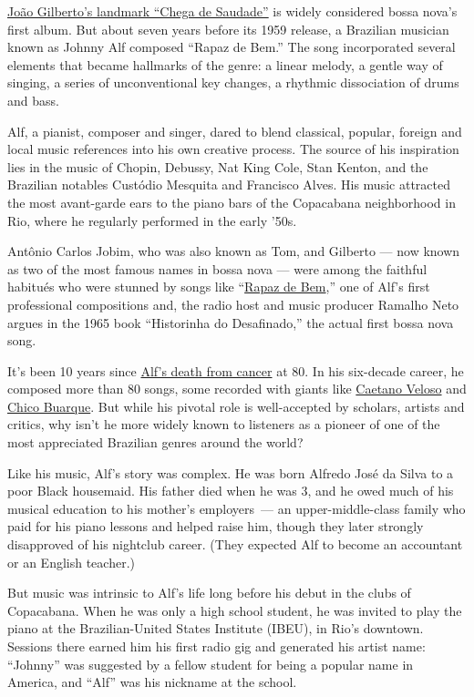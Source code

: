 \href{https://www.youtube.com/watch?v=Zt6JuURjuzg}{João Gilberto's
landmark ``Chega de Saudade''} is widely considered bossa nova's first
album. But about seven years before its 1959 release, a Brazilian
musician known as Johnny Alf composed ``Rapaz de Bem.'' The song
incorporated several elements that became hallmarks of the genre: a
linear melody, a gentle way of singing, a series of unconventional key
changes, a rhythmic dissociation of drums and bass.

Alf, a pianist, composer and singer, dared to blend classical, popular,
foreign and local music references into his own creative process. The
source of his inspiration lies in the music of Chopin, Debussy, Nat King
Cole, Stan Kenton, and the Brazilian notables Custódio Mesquita and
Francisco Alves. His music attracted the most avant-garde ears to the
piano bars of the Copacabana neighborhood in Rio, where he regularly
performed in the early '50s.

Antônio Carlos Jobim, who was also known as Tom, and Gilberto --- now
known as two of the most famous names in bossa nova --- were among the
faithful habitués who were stunned by songs like
``\href{https://www.youtube.com/watch?v=c0rJQ02Fjyo}{Rapaz de Bem},''
one of Alf's first professional compositions and, the radio host and
music producer Ramalho Neto argues in the 1965 book ``Historinha do
Desafinado,'' the actual first bossa nova song.

It's been 10 years since
\href{https://www.nytimes3xbfgragh.onion/2010/03/12/arts/music/12alf.html}{Alf's
death from cancer} at 80. In his six-decade career, he composed more
than 80 songs, some recorded with giants like
\href{https://www.youtube.com/watch?v=Sr20erfxSrk}{Caetano Veloso} and
\href{https://www.youtube.com/watch?v=Z9CfAkqVKvs}{Chico Buarque}. But
while his pivotal role is well-accepted by scholars, artists and
critics, why isn't he more widely known to listeners as a pioneer of one
of the most appreciated Brazilian genres around the world?

Like his music, Alf's story was complex. He was born Alfredo José da
Silva to a poor Black housemaid. His father died when he was 3, and he
owed much of his musical education to his mother's employers~--- an
upper-middle-class family who paid for his piano lessons and helped
raise him, though they later strongly disapproved of his nightclub
career. (They expected Alf to become an accountant or an English
teacher.)

But music was intrinsic to Alf's life long before his debut in the clubs
of Copacabana. When he was only a high school student, he was invited to
play the piano at the Brazilian-United States Institute (IBEU), in Rio's
downtown. Sessions there earned him his first radio gig and generated
his artist name: ``Johnny'' was suggested by a fellow student for being
a popular name in America, and ``Alf'' was his nickname at the school.

